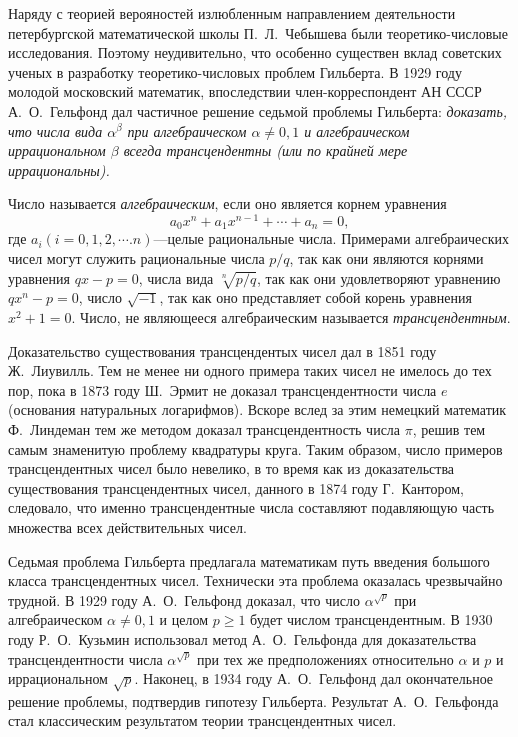 \documentclass[twocolumn,10pt]{article}
\begin{document}
Наряду с теорией верояностей излюбленным направлением деятельности петербургской математической школы П.~Л.~Чебышева были теоретико-числовые исследования. Поэтому неудивительно, что особенно существен вклад советских ученых в разработку теоретико-числовых проблем Гильберта. В 1929 году молодой московский математик, впоследствии член-корреспондент АН СССР А.~О.~Гельфонд дал частичное решение седьмой проблемы Гильберта: \emph{доказать, что числа вида $\alpha ^ \beta$ при алгебраическом $\alpha\ne0, 1$ и алгебраическом иррациональном $\beta$ всегда трансцендентны (или по крайней мере иррациональны).}

{\footnotesize
Число называется \emph{алгебраическим}, если оно является корнем уравнения
$$a_0x^n+a_1x^{n-1}+\cdots+a_n=0,$$
где $a_i(i=0, 1, 2, \cdots. n)$---целые рациональные числа. Примерами алгебраических чисел могут служить рациональные числа $p/q$, так как они являются корнями уравнения $qx-p=0$, числа вида $\sqrt[n]{p/q}$, так как они удовлетворяют уравнению $qx^n-p=0$, число $\sqrt{-1}$, так как оно представляет собой корень уравнения $x^2+1=0$. Число, не являющееся алгебраическим называется \emph{трансцендентным}.
}

Доказательство существования трансцендентых чисел дал в 1851 году Ж.~Лиувилль. Тем не менее ни одного примера таких чисел не имелось до тех пор, пока в 1873 году Ш.~Эрмит не доказал трансцендентности числа $e$ (основания натуральных логарифмов). Вскоре вслед за этим немецкий математик Ф.~Линдеман тем же методом доказал трансцендентность числа $\pi$, решив тем самым знаменитую проблему квадратуры круга. Таким образом, число примеров трансцендентных чисел было невелико, в то время как из доказательства существования трансцендентных чисел, данного в 1874 году Г.~Кантором, следовало, что именно трансцендентные числа составляют подавляющую часть множества всех действительных чисел.

Седьмая проблема Гильберта предлагала математикам путь введения большого класса трансцендентных чисел. Технически эта проблема оказалась чрезвычайно трудной. В 1929 году А.~О.~Гельфонд доказал, что число $\alpha ^{\sqrt{p}}$ при алгебраическом $\alpha\ne0, 1$ и целом $p\ge1$ будет числом трансцендентным. В 1930 году Р.~О.~Кузьмин использовал метод А.~О.~Гельфонда для доказательства трансцендентности числа $\alpha^{\sqrt{p}}$ при тех же предположениях относительно $\alpha$ и $p$ и иррациональном $\sqrt{p}$. Наконец, в 1934 году А.~О.~Гельфонд дал окончательное решение проблемы, подтвердив гипотезу Гильберта. Результат А.~О.~Гельфонда стал классическим результатом теории трансцендентных чисел.
\end{document}
